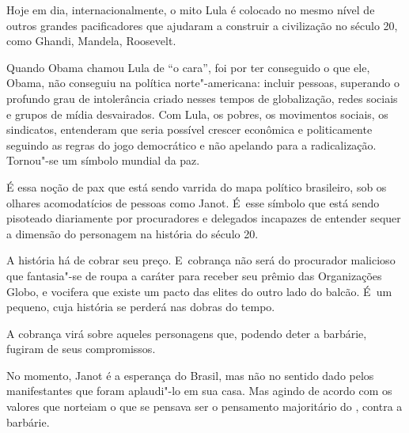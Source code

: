 Hoje em dia, internacionalmente, o mito Lula é colocado no mesmo nível
de outros grandes pacificadores que ajudaram a construir a civilização
no século 20, como Ghandi, Mandela, Roosevelt.

Quando Obama chamou Lula de ``o cara'', foi por ter conseguido o que
ele, Obama, não conseguiu na política norte"-americana: incluir pessoas,
superando o profundo grau de intolerância criado nesses tempos de
globalização, redes sociais e grupos de mídia desvairados. Com Lula, os
pobres, os movimentos sociais, os sindicatos, entenderam que seria
possível crescer econômica e politicamente seguindo as regras do jogo
democrático e não apelando para a radicalização. Tornou"-se um símbolo
mundial da paz.

É essa noção de pax que está sendo varrida do mapa político brasileiro,
sob os olhares acomodatícios de pessoas como Janot. É~esse símbolo que
está sendo pisoteado diariamente por procuradores e delegados incapazes
de entender sequer a dimensão do personagem na história do século 20.

A história há de cobrar seu preço. E~cobrança não será do procurador
malicioso que fantasia"-se de roupa a caráter para receber seu prêmio das
Organizações Globo, e vocifera que existe um pacto das elites do outro
lado do balcão. É~um pequeno, cuja história se perderá nas dobras do
tempo.

A cobrança virá sobre aqueles personagens que, podendo deter a barbárie,
fugiram de seus compromissos.

No momento, Janot é a esperança do Brasil, mas não no sentido dado pelos
manifestantes que foram aplaudi"-lo em sua casa. Mas agindo de acordo com
os valores que norteiam o que se pensava ser o pensamento majoritário do
, contra a barbárie.
